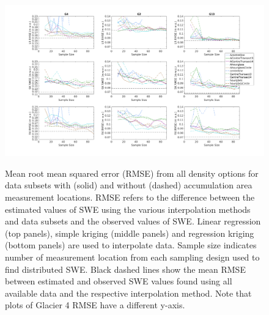 \documentclass[12pt]{article}
\begin{document}
\begin{landscape}
\begin{figure}[H]
	\centering
	\includegraphics[height =0.9\textwidth]{SubsetInterpSizeCompile_RMS.png}\\
	\caption{Mean root mean squared error (RMSE) from all density options for data subsets with (solid) and without (dashed) accumulation area measurement locations. RMSE refers to the difference between the estimated values of SWE using the various interpolation methods and data subsets and the observed values of SWE. Linear regression (top panels), simple kriging (middle panels) and regression kriging (bottom panels) are used to interpolate data. Sample size indicates number of measurement location from each sampling design used to find distributed SWE. Black dashed lines show the mean RMSE between estimated and observed SWE values found using all available data and the respective interpolation method. Note that plots of Glacier 4 RMSE have a different y-axis.}
	\label{fig:SubsetInterpSizeCompile_RMSE}
\end{figure}
\end{landscape}

\end{document}
